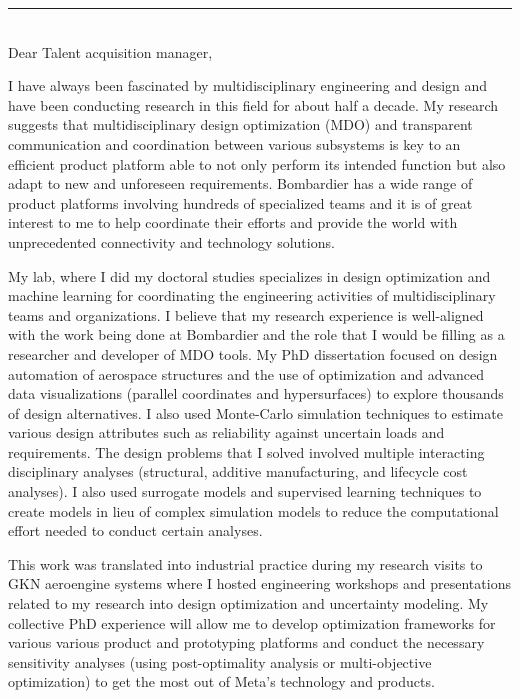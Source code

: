 \documentclass[12pt]{article} %
\begin{document}
\begin{paracol}{2}
\end{paracol}

\medskip %
\rule[0pt]{\textwidth}{1pt}\\

Dear Talent acquisition manager,

\medskip %
I have always been fascinated by multidisciplinary engineering and design and have been conducting research in this field for about half a decade. My research suggests that multidisciplinary design optimization (MDO) and transparent communication and coordination between various subsystems is key to an efficient product platform able to not only perform its intended function but also adapt to new and unforeseen requirements. Bombardier has a wide range of product platforms involving hundreds of specialized teams and it is of great interest to me to help coordinate their efforts and provide the world with unprecedented connectivity and technology solutions.

\medskip %

My lab, where I did my doctoral studies specializes in design optimization and machine learning for coordinating the engineering activities of multidisciplinary teams and organizations. I believe that my research experience is well-aligned with the work being done at Bombardier and the role that I would be filling as a researcher and developer of MDO tools. My PhD dissertation focused on design automation of aerospace structures and the use of optimization and advanced data visualizations (parallel coordinates and hypersurfaces) to explore thousands of design alternatives. I also used Monte-Carlo simulation techniques to estimate various design attributes such as reliability against uncertain loads and requirements. The design problems that I solved involved multiple interacting disciplinary analyses (structural, additive manufacturing, and lifecycle cost analyses). I also used surrogate models and supervised learning techniques to create models in lieu of complex simulation models to reduce the computational effort needed to conduct certain analyses.

\medskip %

This work was translated into industrial practice during my research visits to GKN aeroengine systems where I hosted engineering workshops and presentations related to my research into design optimization and uncertainty modeling. My collective PhD experience will allow me to develop optimization frameworks for various various product and prototyping platforms and conduct the necessary sensitivity analyses (using post-optimality analysis or multi-objective optimization) to get the most out of Meta's technology and products.
\end{document}
